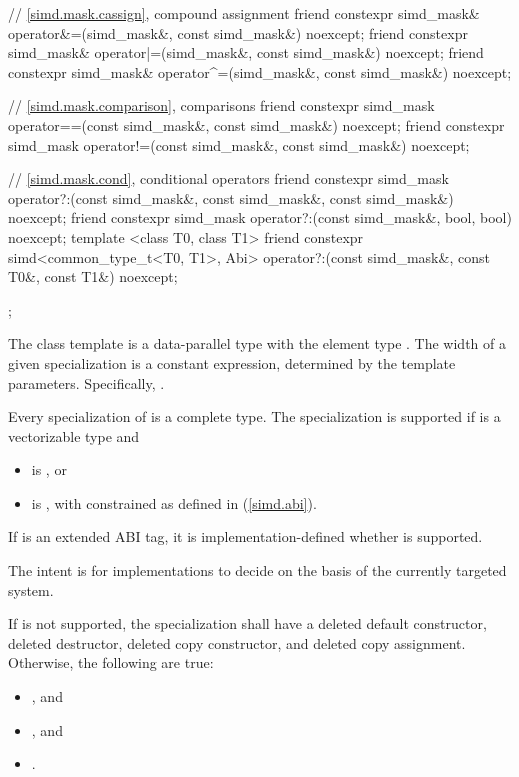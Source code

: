 \begin{codeblock}
{  // \ref{simd.mask.cassign},  compound assignment
  friend constexpr simd_mask& operator&=(simd_mask&, const simd_mask&) noexcept;
  friend constexpr simd_mask& operator|=(simd_mask&, const simd_mask&) noexcept;
  friend constexpr simd_mask& operator^=(simd_mask&, const simd_mask&) noexcept;

  // \ref{simd.mask.comparison},  comparisons
  friend constexpr simd_mask operator==(const simd_mask&, const simd_mask&) noexcept;
  friend constexpr simd_mask operator!=(const simd_mask&, const simd_mask&) noexcept;

  // \ref{simd.mask.cond},  conditional operators
  friend constexpr simd_mask operator?:(const simd_mask&, const simd_mask&, const simd_mask&) noexcept;
  friend constexpr simd_mask operator?:(const simd_mask&, bool, bool) noexcept;
  template <class T0, class T1>
    friend constexpr simd<common_type_t<T0, T1>, Abi>
      operator?:(const simd_mask&, const T0&, const T1&) noexcept;
};
\end{codeblock}

\pnum
The class template  is a data-parallel type with the element type . The width of a given  specialization is a constant expression, determined by the template parameters. Specifically, .

\pnum
Every specialization of  is a complete type. The specialization  is supported if  is a vectorizable type and
\begin{itemize}
  \item {} is , or
  \item {} is , with  constrained as defined in (\ref{simd.abi}).
\end{itemize}

If  is an extended ABI tag, it is implementation-defined whether  is supported. \begin{note}The intent is for implementations to decide on the basis of the currently targeted system.\end{note}

If  is not supported, the specialization shall have a deleted default constructor, deleted destructor, deleted copy constructor, and deleted copy assignment.
Otherwise, the following are true:
\begin{itemize}
  \item {}, and
  \item {}, and
  \item {}.
\end{itemize}

